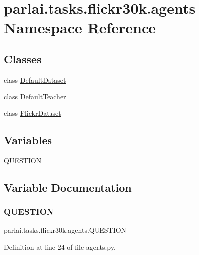 \hypertarget{namespaceparlai_1_1tasks_1_1flickr30k_1_1agents}{}\section{parlai.\+tasks.\+flickr30k.\+agents Namespace Reference}
\label{namespaceparlai_1_1tasks_1_1flickr30k_1_1agents}
\subsection*{Classes}
\begin{DoxyCompactItemize}
\item 
class \hyperlink{classparlai_1_1tasks_1_1flickr30k_1_1agents_1_1DefaultDataset}{Default\+Dataset}
\item 
class \hyperlink{classparlai_1_1tasks_1_1flickr30k_1_1agents_1_1DefaultTeacher}{Default\+Teacher}
\item 
class \hyperlink{classparlai_1_1tasks_1_1flickr30k_1_1agents_1_1FlickrDataset}{Flickr\+Dataset}
\end{DoxyCompactItemize}
\subsection*{Variables}
\begin{DoxyCompactItemize}
\item 
\hyperlink{namespaceparlai_1_1tasks_1_1flickr30k_1_1agents_addfc9f53d4967b328c8d3722b4c6c6f0}{Q\+U\+E\+S\+T\+I\+ON}
\end{DoxyCompactItemize}


\subsection{Variable Documentation}
\mbox{\label{namespaceparlai_1_1tasks_1_1flickr30k_1_1agents_addfc9f53d4967b328c8d3722b4c6c6f0}} 
\subsubsection{\texorpdfstring{Q\+U\+E\+S\+T\+I\+ON}{QUESTION}}
{\footnotesize\ttfamily parlai.\+tasks.\+flickr30k.\+agents.\+Q\+U\+E\+S\+T\+I\+ON}



Definition at line 24 of file agents.\+py.

